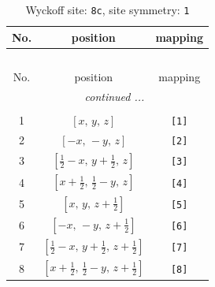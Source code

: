 \documentclass[fleqn,8pt]{jsarticle}
\begin{document}
\renewcommand{\arraystretch}{1.2}
\begin{longtable}{ccc}
\caption{Wyckoff site: {\tt 8c}, site symmetry: {\tt 1}}
 \\
 \hline \hline
No. & position & mapping \\ \hline \endfirsthead

\multicolumn{2}{l}{\tablename\ \thetable{}} \\
 \hline \hline
No. & position & mapping \\ \hline \endhead

 \hline \hline
\multicolumn{2}{r}{\footnotesize\it continued ...} \\ \endfoot

 \hline \hline
\multicolumn{2}{r}{} \\ \endlastfoot

1 & $\left[ x,\, y,\, z \right]$ & {\tt [1]} \\ \hline
2 & $\left[ - x,\, - y,\, z \right]$ & {\tt [2]} \\ \hline
3 & $\left[ \frac{1}{2} - x,\, y + \frac{1}{2},\, z \right]$ & {\tt [3]} \\ \hline
4 & $\left[ x + \frac{1}{2},\, \frac{1}{2} - y,\, z \right]$ & {\tt [4]} \\ \hline
5 & $\left[ x,\, y,\, z + \frac{1}{2} \right]$ & {\tt [5]} \\ \hline
6 & $\left[ - x,\, - y,\, z + \frac{1}{2} \right]$ & {\tt [6]} \\ \hline
7 & $\left[ \frac{1}{2} - x,\, y + \frac{1}{2},\, z + \frac{1}{2} \right]$ & {\tt [7]} \\ \hline
8 & $\left[ x + \frac{1}{2},\, \frac{1}{2} - y,\, z + \frac{1}{2} \right]$ & {\tt [8]} \\
\end{longtable}
\end{document}
